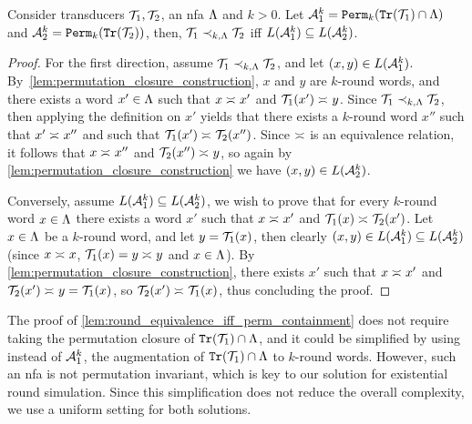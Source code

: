 \begin{lemma}
\label{lem:round_equivalence_iff_perm_containment}
	Consider transducers $\mathcal{T}_1,\mathcal{T}_2$, an \gls{nfa} $\Lambda$ and $k>0$. Let $\mathcal{A}_1^k={\mathtt{Perm}}_k({\mathtt{Tr}}(\mathcal{T}_1)\cap\Lambda)$ and $\mathcal{A}_2^k={\mathtt{Perm}}_k({\mathtt{Tr}}(\mathcal{T}_2))$,
	then, $\mathcal{T}_1\prec_{k,\Lambda} \mathcal{T}_2$ iff $L(\mathcal{A}^k_1)\subseteq L(\mathcal{A}^k_2)$.
\end{lemma}
\begin{proof}
	For the first direction, assume $\mathcal{T}_1\prec_{k,\Lambda} \mathcal{T}_2$, and let $(x,y)\in L(\mathcal{A}^k_1)$. By~\autoref{lem:permutation_closure_construction}, $x$ and $y$ are $k$-round words, and there exists a word $x'\in \Lambda$ such that $x\asymp_{} x'$ and $\mathcal{T}_1(x')\asymp_{} y$. Since $\mathcal{T}_1\prec_{k,\Lambda} \mathcal{T}_2$, then applying the definition on $x'$ yields that there exists a $k$-round word $x''$ such that $x'\asymp_{} x''$ and such that $\mathcal{T}_1(x')\asymp_{} \mathcal{T}_2(x'')$. Since $\asymp_{}$ is an equivalence relation, it follows that $x\asymp_{} x''$ and $\mathcal{T}_2(x'')\asymp_{} y$, so again by \autoref{lem:permutation_closure_construction} we have $(x,y)\in L(\mathcal{A}^k_2)$.
	
	Conversely, assume $L(\mathcal{A}^k_1)\subseteq L(\mathcal{A}^k_2)$, we wish to prove that for every $k$-round word $x\in \Lambda$ there exists a word $x'$ such that $x\asymp_{} x'$ and $\mathcal{T}_1(x)\asymp_{} \mathcal{T}_2(x')$. Let $x\in \Lambda$ be a $k$-round word, and let $y=\mathcal{T}_1(x)$, then clearly $(x,y)\in L(\mathcal{A}^k_1)\subseteq L(\mathcal{A}^k_2)$ (since $x\asymp_{} x$, $\mathcal{T}_1(x)=y\asymp_{} y$ and $x\in \Lambda$). By \autoref{lem:permutation_closure_construction}, there exists $x'$ such that $x\asymp_{} x'$ and $\mathcal{T}_2(x')\asymp_{} y=\mathcal{T}_1(x)$, so $\mathcal{T}_2(x')\asymp_{} \mathcal{T}_1(x)$, thus concluding the proof.
\end{proof}

\begin{remark}
\label{rmk:det_A1}
The proof of \autoref{lem:round_equivalence_iff_perm_containment} does not require taking the permutation closure of ${\mathtt{Tr}}(\mathcal{T}_1)\cap \Lambda$, and it could be simplified by using instead of $\mathcal{A}^k_1$, the augmentation of ${\mathtt{Tr}}(\mathcal{T}_1)\cap \Lambda$ to $k$-round words. However, such an \gls{nfa} is not permutation invariant, which is key to our solution for existential round simulation. Since this simplification does not reduce the overall complexity, we use a uniform setting for both solutions.
\end{remark}

